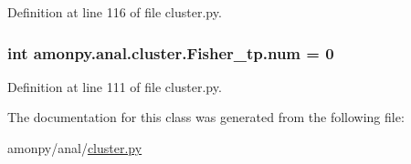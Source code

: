 Definition at line 116 of file cluster.\-py.

\hypertarget{classamonpy_1_1anal_1_1cluster_1_1_fisher__tp_a3eff8425c58f4b61a8bff758141bfc3e}{
\subsubsection[{num}]{\setlength{\rightskip}{0pt plus 5cm}int amonpy.\-anal.\-cluster.\-Fisher\-\_\-tp.\-num = 0\hspace{0.3cm}{\ttfamily [static]}}}\label{classamonpy_1_1anal_1_1cluster_1_1_fisher__tp_a3eff8425c58f4b61a8bff758141bfc3e}


Definition at line 111 of file cluster.\-py.



The documentation for this class was generated from the following file\-:\begin{DoxyCompactItemize}
\item 
amonpy/anal/\hyperlink{cluster_8py}{cluster.\-py}\end{DoxyCompactItemize}
